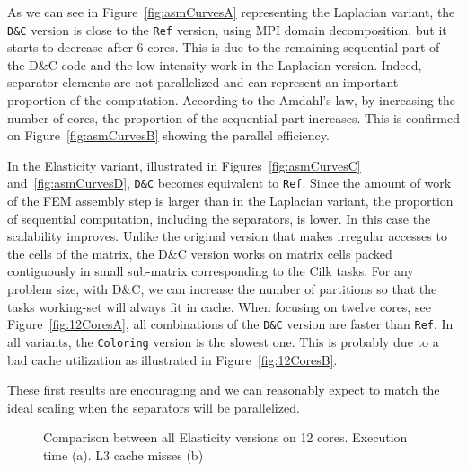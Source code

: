 \documentclass[10pt]{IOS-Book-Article}
\begin{document}
As we can see in Figure~\ref{fig:asmCurvesA} representing the Laplacian variant, the {\tt D\&C} version is close to the {\tt Ref} version, using MPI domain decomposition, but it starts to decrease after 6 cores.
This is due to the remaining sequential part of the D\&C code and the low intensity work in the Laplacian version.
Indeed, separator elements are not parallelized and can represent an important proportion of the computation.
According to the Amdahl's law, by increasing the number of cores, the proportion of the sequential part increases.
This is confirmed on Figure~\ref{fig:asmCurvesB} showing the parallel efficiency.

In the Elasticity variant, illustrated in Figures~\ref{fig:asmCurvesC} and~\ref{fig:asmCurvesD}, {\tt D\&C} becomes equivalent to {\tt Ref}.
Since the amount of work of the FEM assembly step is larger than in the Laplacian variant, the proportion of sequential computation, including the separators, is lower.
In this case the scalability improves.
Unlike the original version that makes irregular accesses to the cells of the matrix, the D\&C version works on matrix cells packed contiguously in small sub-matrix corresponding to the Cilk tasks.
For any problem size, with D\&C, we can increase the number of partitions so that the tasks working-set will always fit in cache.
When focusing on twelve cores, see Figure~\ref{fig:12CoresA}, all combinations of the {\tt D\&C} version are faster than {\tt Ref}.
In all variants, the {\tt Coloring} version is the slowest one.
This is probably due to a bad cache utilization as illustrated in Figure~\ref{fig:12CoresB}.

These first results are encouraging and we can reasonably expect to match the ideal scaling when the separators will be parallelized.

\begin{figure}[htp]
 \caption{Comparison between all Elasticity versions on 12 cores. Execution time (a). L3 cache misses (b)}
 \label{fig:12Cores}
\end{figure}
\end{document}
